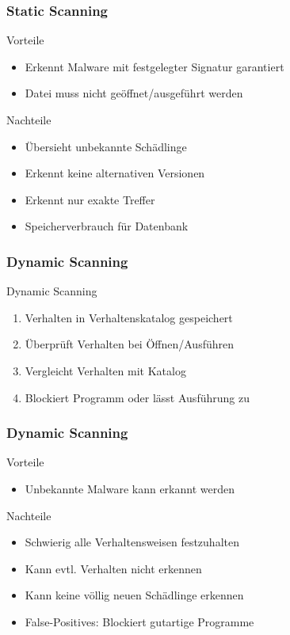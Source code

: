 \documentclass{beamer}
\begin{document}
\begin{frame}
	\frametitle{Static Scanning}
	\begin{block}{Vorteile}
		\begin{itemize}
			\item Erkennt Malware mit festgelegter Signatur garantiert
			\item Datei muss nicht geöffnet/ausgeführt werden
		\end{itemize}
	\end{block} 
	\begin{block}{Nachteile}
		\begin{itemize}
			\item Übersieht unbekannte Schädlinge
			\item Erkennt keine alternativen Versionen
			\item Erkennt nur exakte Treffer
			\item Speicherverbrauch für Datenbank
		\end{itemize}
	\end{block}
\end{frame}

\begin{frame}
\frametitle{Dynamic Scanning}
\begin{block}{Dynamic Scanning}
	\begin{enumerate}
		\item Verhalten in Verhaltenskatalog gespeichert
		\item Überprüft Verhalten bei Öffnen/Ausführen
		\item Vergleicht Verhalten mit Katalog
		\item Blockiert Programm oder lässt Ausführung zu
	\end{enumerate}
	
\end{block} 
\end{frame}

\begin{frame}
	\frametitle{Dynamic Scanning}
	\begin{block}{Vorteile}
		\begin{itemize}
			\item Unbekannte Malware kann erkannt werden
		\end{itemize}
	\end{block} 
	\begin{block}{Nachteile}
		\begin{itemize}
			\item Schwierig alle Verhaltensweisen festzuhalten
			\item Kann evtl. Verhalten nicht erkennen
			\item Kann keine völlig neuen Schädlinge erkennen
			\item False-Positives: Blockiert gutartige Programme
		\end{itemize}
	\end{block}
\end{frame}
\end{document}
